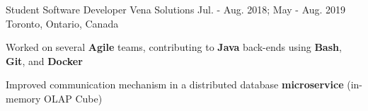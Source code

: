 \begin{cventries}
  \cventry
    {Student Software Developer} %
    {Vena Solutions} %
    {Jul. - Aug. 2018; May - Aug. 2019} %
    {Toronto, Ontario, Canada} %
    {
      \begin{cvitems} %
        \item{Worked on several \textbf{Agile} teams, contributing to \textbf{Java} back-ends using \textbf{Bash}, \textbf{Git}, and \textbf{Docker}}
        \item{Improved communication mechanism in a distributed database \textbf{microservice} (in-memory OLAP Cube)}
      \end{cvitems}
    }



\end{cventries}
